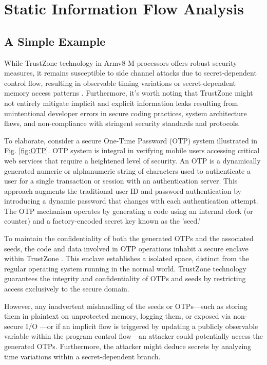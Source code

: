 \section{Static Information Flow Analysis} \label{sect:design}
%
\subsection{A Simple Example}

While TrustZone technology in Armv8-M processors offers robust security measures, it remains susceptible to side channel attacks due to secret-dependent control flow, resulting in observable timing variations or secret-dependent memory access patterns \cite{armdeveloper}. Furthermore, it's worth noting that TrustZone might not entirely mitigate implicit and explicit information leaks resulting from unintentional developer errors in secure coding practices, system architecture flaws, and non-compliance with stringent security standards and protocols.

To elaborate, consider a secure One-Time Password (\gls{OTP}) system illustrated in Fig. \ref{fig:OTP}. \gls{OTP} system is integral in verifying mobile users accessing critical web services that require a heightened level of security. An \gls{OTP} is a dynamically generated numeric or alphanumeric string of characters used to authenticate a user for a single transaction or session with an authentication server. This approach augments the traditional user ID and password authentication by introducing a dynamic password that changes with each authentication attempt. The \gls{OTP} mechanism operates by generating a code using an internal clock (or counter) and a factory-encoded secret key known as the 'seed.' 

To maintain the confidentiality of both the generated \gls{OTP}s and the associated seeds, the code and data involved in \gls{OTP} operations inhabit a secure enclave within TrustZone \cite{trustotp}. This enclave establishes a isolated space, distinct from the regular operating system running in the normal world. TrustZone technology guarantees the integrity and confidentiality of \gls{OTP}s and seeds by restricting access exclusively to the secure domain.

However, any inadvertent mishandling of the seeds or \gls{OTP}s—such as storing them in plaintext on unprotected memory, logging them, or exposed via non-secure I/O —or if an implicit flow is triggered by updating a publicly observable variable within the program control flow—an attacker could potentially access the generated \gls{OTP}s. Furthermore, the attacker might deduce secrets by analyzing time variations within a secret-dependent branch.


